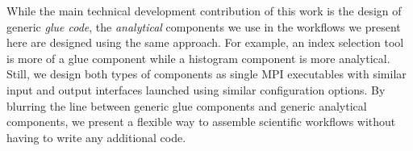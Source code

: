 While the main technical development contribution of this work is the design of
generic {\em glue code}, the {\em analytical} components we use in the
workflows we present here are designed using the same approach. For example, an
index selection tool is more of a glue component while a histogram component is
more analytical.  Still, we design both types of components as single MPI
executables with similar input and output interfaces launched using similar
configuration options.  By blurring the line between generic glue components
and generic analytical components, we present a flexible way to assemble
scientific workflows without having to write any additional code. 
\fi


